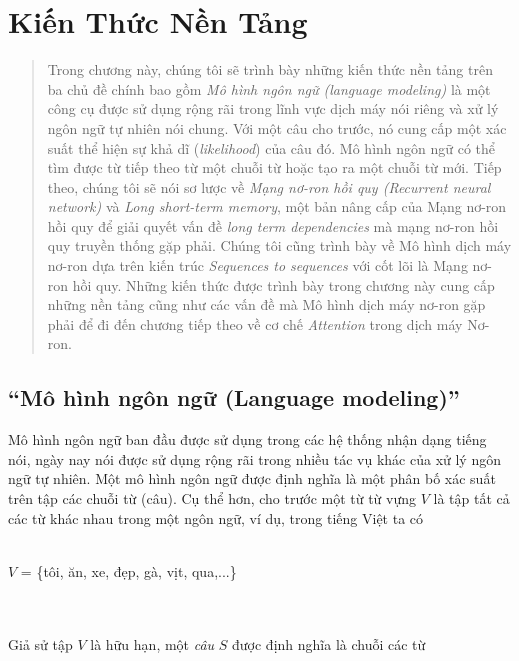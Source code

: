 \chapter{Kiến Thức Nền Tảng}
\ifpdf
    \graphicspath{{Chapter2/Chapter2Figs/PNG/}{Chapter2/Chapter2Figs/PDF/}{Chapter2/Chapter2Figs/}}
\else
    \graphicspath{{Chapter2/Chapter2Figs/EPS/}{Chapter2/Chapter2Figs/}}
\fi

\begin{quote}

Trong chương này, chúng tôi sẽ trình bày những kiến thức nền tảng trên ba chủ đề chính bao gồm \textit{Mô hình ngôn ngữ (language modeling)} là một công cụ được sử dụng rộng rãi trong lĩnh vực dịch máy nói riêng và xử lý ngôn ngữ tự nhiên nói chung. Với một câu cho trước, nó cung cấp một xác suất thể hiện sự khả dĩ (\textit{likelihood}) của câu đó. Mô hình ngôn ngữ có thể tìm được từ tiếp theo từ một chuỗi từ hoặc tạo ra một chuỗi từ mới. Tiếp theo, chúng tôi sẽ nói sơ lược về \textit{Mạng nơ-ron hồi quy (Recurrent neural network)} và \textit{Long short-term memory}, một bản nâng cấp của Mạng nơ-ron hồi quy để giải quyết vấn đề \textit{long term dependencies} mà mạng nơ-ron hồi quy truyền thống gặp phải. Chúng tôi cũng trình bày về Mô hình dịch máy nơ-ron dựa trên kiến trúc \textit{Sequences to sequences} với cốt lõi là Mạng nơ-ron hồi quy. Những kiến thức được trình bày trong chương này cung cấp những nền tảng cũng như các vấn đề mà Mô hình dịch máy nơ-ron gặp phải để đi đến chương tiếp theo về cơ chế \textit{Attention} trong dịch máy Nơ-ron.

\end{quote}
\section{``Mô hình ngôn ngữ (Language modeling)''}
Mô hình ngôn ngữ ban đầu được sử dụng trong các hệ thống nhận dạng tiếng nói, ngày nay nói được sử dụng rộng rãi trong nhiều tác vụ khác của xử lý ngôn ngữ tự nhiên. Một mô hình ngôn ngữ được định nghĩa là một phân bố xác suất trên tập các chuỗi từ (câu). Cụ thể hơn, cho trước một từ từ vựng $V$ là tập tất cả các từ khác nhau trong một ngôn ngữ, ví dụ, trong tiếng Việt ta có\\\\
\centerline{$V$ = \{tôi, ăn, xe, đẹp, gà, vịt, qua,...\}}\\\\
Giả sử tập $V$ là hữu hạn, một \textit{câu} $S$ được định nghĩa là chuỗi các từ

